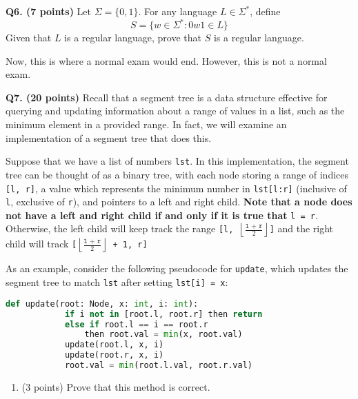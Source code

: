 \documentclass{article}
\begin{document}
    \pagebreak

    \noindent\textbf{Q6. (7 points)} Let \(\Sigma = \{0, 1\}\). For any language \(L \in \Sigma ^*\), define
    \[
        S = \{w \in \Sigma ^* : 0w1 \in L\}
    \]
    Given that \(L\) is a regular language, prove that \(S\) is a regular language.

    \pagebreak

    Now, this is where a normal exam would end. However, this is not a normal exam.

    \bigskip

    \noindent\textbf{Q7. (20 points)} Recall that a segment tree is a data structure effective for querying and updating information about a range of values in a list, such as the minimum element in a provided range. In fact, we will examine an implementation of a segment tree that does this.

    \medskip

    Suppose that we have a list of numbers \texttt{lst}. In this implementation, the segment tree can be thought of as a binary tree, with each node storing a range of indices \texttt{[l, r]}, a value which represents the minimum number in \texttt{lst[l:r]} (inclusive of \texttt{l}, exclusive of \texttt{r}), and pointers to a left and right child. \textbf{Note that a node does not have a left and right child if and only if it is true that} \texttt{l = r}. Otherwise, the left child will keep track the range \texttt{[l, \(\left\lfloor \frac{\texttt{l + r}}{2} \right\rfloor\)]} and the right child will track \texttt{[\(\left\lfloor \frac{\texttt{l + r}}{2} \right\rfloor\) + 1, r]}

    \medskip

    As an example, consider the following pseudocode for \texttt{update}, which updates the segment tree to match \texttt{lst} after setting \texttt{lst[i] = x}:

    \begin{lstlisting}[language=Python]
        def update(root: Node, x: int, i: int):
            if i not in [root.l, root.r] then return
            else if root.l == i == root.r
                then root.val = min(x, root.val)
            update(root.l, x, i)
            update(root.r, x, i)
            root.val = min(root.l.val, root.r.val)
    \end{lstlisting}
    \begin{enumerate}[label=\alph*)]
        \item (3 points) Prove that this method is correct.
    \end{enumerate}
\end{document}
